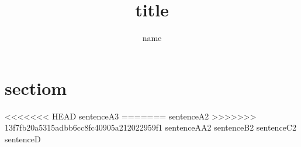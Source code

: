 \documentclass{jarticle}
\title{title}
\author{name}
\begin{document}
\maketitle
\section{sectiom}
<<<<<<< HEAD
sentenceA3
=======
sentenceA2
>>>>>>> 13f7fb20a5315adbb6cc8fc40905a212022959f1
sentenceAA2
sentenceB2
sentenceC2
sentenceD
\end{document}

